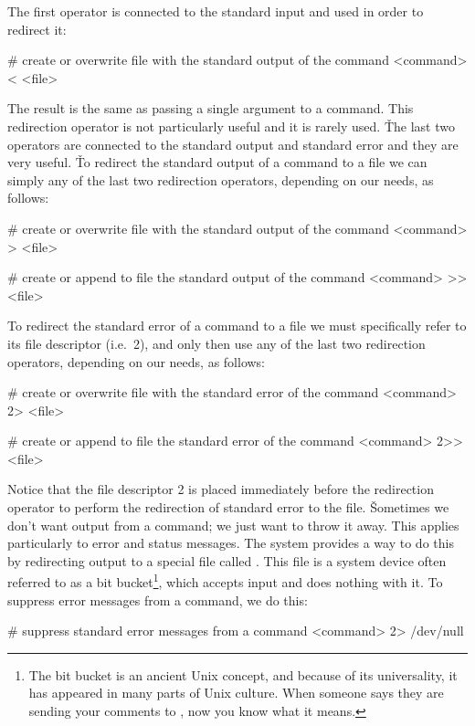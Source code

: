 The first operator is connected to the standard input and used in order to redirect it:
\begin{bash}
# create or overwrite file with the standard output of the command
<command> < <file>
\end{bash}

The result is the same as passing a single argument to a command. This redirection operator is not particularly useful
and it is rarely used. \v

The last two operators are connected to the standard output and standard error and they are very useful. \v

To redirect the standard output of a command to a file we can simply any of the last two redirection operators,
depending on our needs, as follows:
\begin{bash}
# create or overwrite file with the standard output of the command
<command> > <file>
\end{bash}

\begin{bash}
# create or append to file the standard output of the command
<command> >> <file>
\end{bash}

To redirect the standard error of a command to a file we must specifically refer to its file descriptor (i.e.\ 2),
and only then use any of the last two redirection operators, depending on our needs, as follows:
\begin{bash}
# create or overwrite file with the standard error of the command
<command> 2> <file>
\end{bash}

\begin{bash}
# create or append to file the standard error of the command
<command> 2>> <file>
\end{bash}

Notice that the file descriptor 2 is placed immediately before the redirection operator to perform the redirection of
standard error to the file. \v

Sometimes we don't want output from a command; we just want to throw it away. This applies particularly to error and
status messages. The system provides a way to do this by redirecting output to a special file called .
This file is a system device often referred to as a bit bucket\footnote{The bit bucket is an ancient Unix concept,
and because of its universality, it has appeared in many parts of Unix culture. When someone says they are sending
your comments to , now you know what it means.}, which accepts input and does nothing with it. To
suppress error messages from a command, we do this:
\begin{bash}
# suppress standard error messages from a command
<command> 2> /dev/null
\end{bash}

